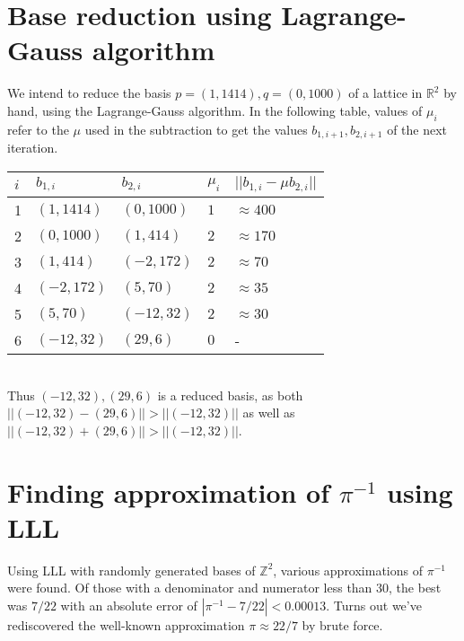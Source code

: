 \documentclass[a4paper]{scrreprt}
\begin{document}
\section{Base reduction using Lagrange-Gauss algorithm}

We intend to reduce the basis $p = (1, 1414), q = (0, 1000)$ of a lattice in
$\mathbb{R}^2$ by hand, using the Lagrange-Gauss algorithm. In the following
table, values of $\mu_i$ refer to the $\mu$ used in the subtraction to get the
values $b_{1, i+1}, b_{2, i+1}$ of the next iteration. \\

\begin{tabular}{lllll}
		\toprule
		$i$ & $b_{1, i}$ & $b_{2, i}$ & $\mu_{i}$ & $||b_{1, i} - \mu b_{2, i}||$ \\
		\midrule
		1 & $(1, 1414)$ & $(0, 1000)$ & $1$ & $\approx 400$ \\
		2 & $(0, 1000)$ & $(1, 414)$  & $2$ & $\approx 170$ \\
		3 & $(1, 414)$  & $(-2, 172)$ & $2$ & $\approx 70$ \\
		4 & $(-2, 172)$ & $(5, 70)$   & $2$ & $\approx 35$ \\
		5 & $(5, 70)$   & $(-12, 32)$ & $2$ & $\approx 30$ \\
		6 & $(-12, 32)$ & $(29, 6)$   & $0$ & - \\
		\bottomrule
\end{tabular}\\

Thus $(-12, 32), (29, 6)$ is a reduced basis, as both $||(-12, 32) - (29, 6)||
> ||(-12, 32)||$ as well as $||(-12, 32) + (29, 6)|| > ||(-12, 32)||$.

\section{Finding approximation of $\pi^{-1}$ using LLL}

Using LLL with randomly generated bases of $\mathbb{Z}^2$, various
approximations of $\pi^{-1}$ were found. Of those with a denominator and
numerator less than 30, the best was $7/22$ with an absolute error of
$|\pi^{-1} - 7/22| < 0.00013$. Turns out we've rediscovered the well-known
approximation $\pi \approx 22/7$ by brute force.

\printbibliography{}
\end{document}
